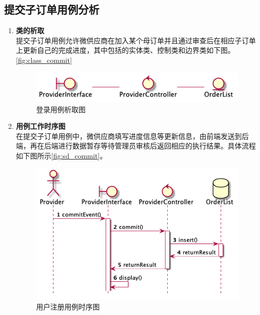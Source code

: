 
	\subsection{提交子订单用例分析} %
	\label{sub:提交子订单用例分析}
	\begin{enumerate}
		\item \textbf{类的析取} \\
		提交子订单用例允许微供应商在加入某个母订单并且通过审查后在相应子订单上更新自己的完成进度，其中包括的实体类、控制类和边界类如下图。
		\autoref{fig:class_commit}
		\begin{figure}[htp]
		    \centering
		    \includegraphics[width=12cm]{misc/figure_src/class_diagram/commit.png}
		    \caption{登录用例析取图}
		    \label{fig:class_commit}
		\end{figure}

		\item \textbf{用例工作时序图} \\
		在提交子订单用例中，微供应商填写进度信息等更新信息，由前端发送到后端，再在后端进行数据暂存等待管理员审核后返回相应的执行结果。具体流程如下图所示\autoref{fig:sd_commit}。

		\begin{figure}[htp]
		    \centering
		    \includegraphics[width=12cm]{misc/figure_src/sequence_diagram/sd_commitOrder.png}
		    \caption{用户注册用例时序图}
		    \label{fig:sd_commit}
		\end{figure}

	\end{enumerate}

